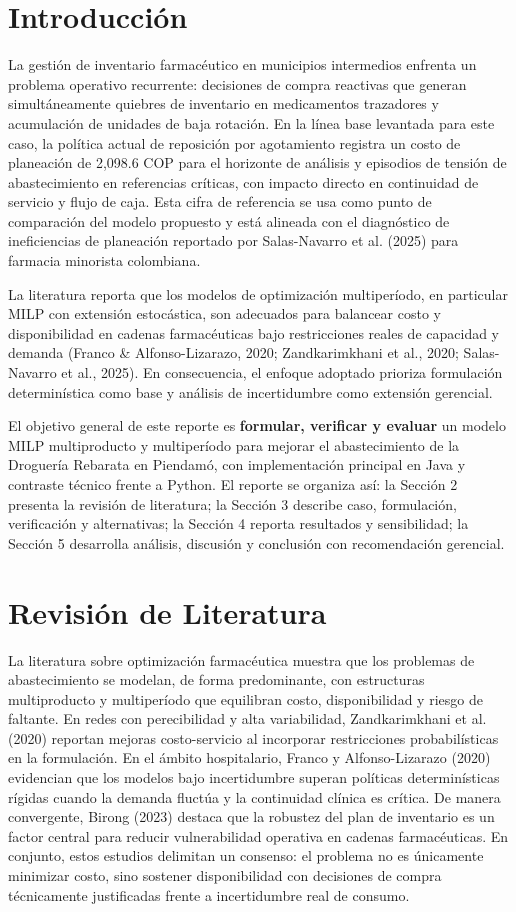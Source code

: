 \documentclass[12pt,letterpaper]{article}
\begin{document}
\section{Introducción}
La gestión de inventario farmacéutico en municipios intermedios enfrenta un problema operativo recurrente: decisiones de compra reactivas que generan simultáneamente quiebres de inventario en medicamentos trazadores y acumulación de unidades de baja rotación. En la línea base levantada para este caso, la política actual de reposición por agotamiento registra un costo de planeación de 2,098.6 COP para el horizonte de análisis y episodios de tensión de abastecimiento en referencias críticas, con impacto directo en continuidad de servicio y flujo de caja. Esta cifra de referencia se usa como punto de comparación del modelo propuesto y está alineada con el diagnóstico de ineficiencias de planeación reportado por Salas-Navarro et al. (2025) para farmacia minorista colombiana.

La literatura reporta que los modelos de optimización multiperíodo, en particular MILP con extensión estocástica, son adecuados para balancear costo y disponibilidad en cadenas farmacéuticas bajo restricciones reales de capacidad y demanda (Franco \& Alfonso-Lizarazo, 2020; Zandkarimkhani et al., 2020; Salas-Navarro et al., 2025). En consecuencia, el enfoque adoptado prioriza formulación determinística como base y análisis de incertidumbre como extensión gerencial.

El objetivo general de este reporte es \textbf{formular, verificar y evaluar} un modelo MILP multiproducto y multiperíodo para mejorar el abastecimiento de la Droguería Rebarata en Piendamó, con implementación principal en Java y contraste técnico frente a Python. El reporte se organiza así: la Sección 2 presenta la revisión de literatura; la Sección 3 describe caso, formulación, verificación y alternativas; la Sección 4 reporta resultados y sensibilidad; la Sección 5 desarrolla análisis, discusión y conclusión con recomendación gerencial.

\section{Revisión de Literatura}
La literatura sobre optimización farmacéutica muestra que los problemas de abastecimiento se modelan, de forma predominante, con estructuras multiproducto y multiperíodo que equilibran costo, disponibilidad y riesgo de faltante. En redes con perecibilidad y alta variabilidad, Zandkarimkhani et al. (2020) reportan mejoras costo-servicio al incorporar restricciones probabilísticas en la formulación. En el ámbito hospitalario, Franco y Alfonso-Lizarazo (2020) evidencian que los modelos bajo incertidumbre superan políticas determinísticas rígidas cuando la demanda fluctúa y la continuidad clínica es crítica. De manera convergente, Birong (2023) destaca que la robustez del plan de inventario es un factor central para reducir vulnerabilidad operativa en cadenas farmacéuticas. En conjunto, estos estudios delimitan un consenso: el problema no es únicamente minimizar costo, sino sostener disponibilidad con decisiones de compra técnicamente justificadas frente a incertidumbre real de consumo.
\end{document}
